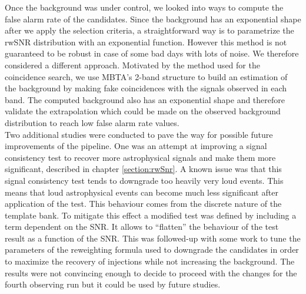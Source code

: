 Once the background was under control, we looked into ways to compute the false alarm rate of the candidates.
Since the background has an exponential shape after we apply the selection criteria, a straightforward way is to parametrize the rwSNR distribution with an exponential function.
However this method is not guaranteed to be robust in case of some bad days with lots of noise.
We therefore considered a different approach.
Motivated by the method used for the coincidence search, we use MBTA's 2-band structure to build an estimation of the background by making fake coincidences with the signals observed in each band.
The computed background also has an exponential shape and therefore validate the extrapolation which could be made on the observed background distribution to reach low false alarm rate values.\\

Two additional studies were conducted to pave the way for possible future improvements of the pipeline.
One was an attempt at improving a signal consistency test to recover more astrophysical signals and make them more significant, described in chapter \ref{section:rwSnr}.
A known issue was that this signal consistency test tends to downgrade too heavily very loud events.
This means that loud astrophysical events can become much less significant after application of the test.
This behaviour comes from the discrete nature of the template bank.
To mitigate this effect a modified test was defined by including a term dependent on the SNR.
It allows to ``flatten'' the behaviour of the test result as a function of the SNR.
This was followed-up with some work to tune the parameters of the reweighting formula used to downgrade the candidates in order to maximize the recovery of injections while not increasing the background.
The results were not convincing enough to decide to proceed with the changes for the fourth observing run but it could be used by future studies.\\

